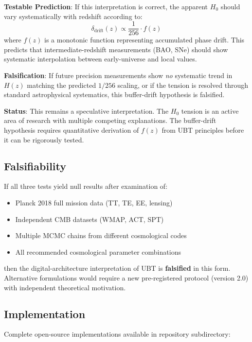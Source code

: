 \textbf{Testable Prediction}: If this interpretation is correct, the apparent $H_0$ should vary systematically with redshift according to:
\begin{equation}
\delta_{\text{drift}}(z) \propto \frac{1}{256} \cdot f(z)
\end{equation}
where $f(z)$ is a monotonic function representing accumulated phase drift. This predicts that intermediate-redshift measurements (BAO, SNe) should show systematic interpolation between early-universe and local values.

\textbf{Falsification}: If future precision measurements show \textit{no} systematic trend in $H(z)$ matching the predicted $1/256$ scaling, or if the tension is resolved through standard astrophysical systematics, this buffer-drift hypothesis is falsified.

\textbf{Status}: This remains a speculative interpretation. The $H_0$ tension is an active area of research with multiple competing explanations. The buffer-drift hypothesis requires quantitative derivation of $f(z)$ from UBT principles before it can be rigorously tested.

\subsection{Falsifiability}

If all three tests yield null results after examination of:
\begin{itemize}
    \item Planck 2018 full mission data (TT, TE, EE, lensing)
    \item Independent CMB datasets (WMAP, ACT, SPT)
    \item Multiple MCMC chains from different cosmological codes
    \item All recommended cosmological parameter combinations
\end{itemize}

then the digital-architecture interpretation of UBT is \textbf{falsified} in this form. Alternative formulations would require a new pre-registered protocol (version 2.0) with independent theoretical motivation.

\subsection{Implementation}

Complete open-source implementations available in repository subdirectory:


